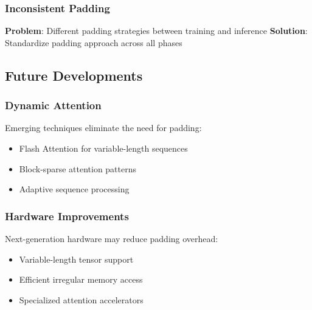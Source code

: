 \subsubsection{Inconsistent Padding}
\textbf{Problem}: Different padding strategies between training and inference
\textbf{Solution}: Standardize padding approach across all phases

\subsection{Future Developments}

\subsubsection{Dynamic Attention}
Emerging techniques eliminate the need for padding:
\begin{itemize}
\item Flash Attention for variable-length sequences
\item Block-sparse attention patterns
\item Adaptive sequence processing
\end{itemize}

\subsubsection{Hardware Improvements}
Next-generation hardware may reduce padding overhead:
\begin{itemize}
\item Variable-length tensor support
\item Efficient irregular memory access
\item Specialized attention accelerators
\end{itemize}


